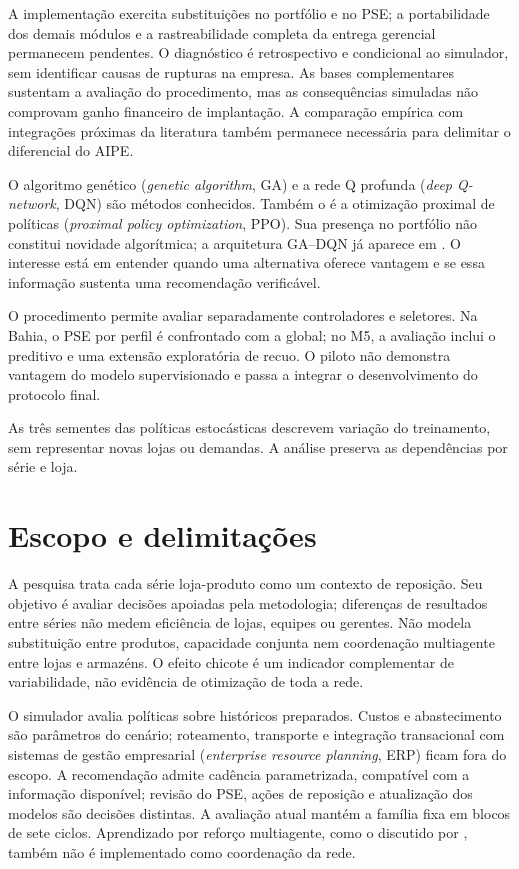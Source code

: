 A implementação exercita substituições no portfólio e no PSE; a portabilidade dos demais módulos e a rastreabilidade completa da entrega gerencial permanecem pendentes. O diagnóstico é retrospectivo e condicional ao simulador, sem identificar causas de rupturas na empresa. As bases complementares sustentam a avaliação do procedimento, mas as consequências simuladas não comprovam ganho financeiro de implantação. A comparação empírica com integrações próximas da literatura também permanece necessária para delimitar o diferencial do AIPE.

O algoritmo genético (\textit{genetic algorithm}, GA) e a rede Q profunda (\textit{deep Q-network}, DQN) são métodos conhecidos. Também o é a otimização proximal de políticas (\textit{proximal policy optimization}, PPO). Sua presença no portfólio não constitui novidade algorítmica; a arquitetura GA--DQN já aparece em \citet{Zabraoui2025GaDQN}. O interesse está em entender quando uma alternativa oferece vantagem e se essa informação sustenta uma recomendação verificável.

O procedimento permite avaliar separadamente controladores e seletores. Na Bahia, o PSE por perfil é confrontado com a global; no M5, a avaliação inclui o preditivo e uma extensão exploratória de recuo. O piloto não demonstra vantagem do modelo supervisionado e passa a integrar o desenvolvimento do protocolo final.

As três sementes das políticas estocásticas descrevem variação do treinamento, sem representar novas lojas ou demandas. A análise preserva as dependências por série e loja.

\section{Escopo e delimitações}
\label{sec:delimitacoes}

A pesquisa trata cada série loja-produto como um contexto de reposição. Seu objetivo é avaliar decisões apoiadas pela metodologia; diferenças de resultados entre séries não medem eficiência de lojas, equipes ou gerentes. Não modela substituição entre produtos, capacidade conjunta nem coordenação multiagente entre lojas e armazéns. O efeito chicote é um indicador complementar de variabilidade, não evidência de otimização de toda a rede.

O simulador avalia políticas sobre históricos preparados. Custos e abastecimento são parâmetros do cenário; roteamento, transporte e integração transacional com sistemas de gestão empresarial (\textit{enterprise resource planning}, ERP) ficam fora do escopo. A recomendação admite cadência parametrizada, compatível com a informação disponível; revisão do PSE, ações de reposição e atualização dos modelos são decisões distintas. A avaliação atual mantém a família fixa em blocos de sete ciclos. Aprendizado por reforço multiagente, como o discutido por \citet{Liu2024HAPPO}, também não é implementado como coordenação da rede.

